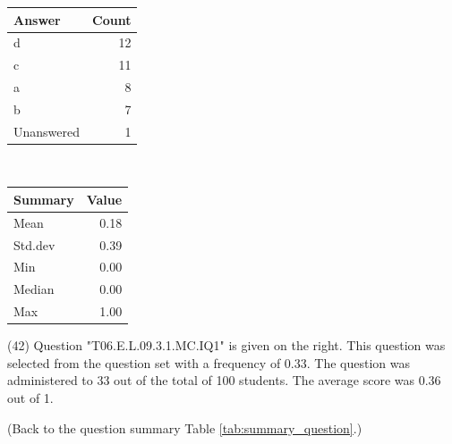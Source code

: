 \documentclass[12pt,nohyper]{tufte-handout}\usepackage[]{graphicx}\usepackage[]{color}
\begin{document}
\begin{center}%
\begin{tabular}{lr}
  \hline
Answer & Count \\ 
  \hline
d &  12 \\ 
  c &  11 \\ 
  a &   8 \\ 
  b &   7 \\ 
  Unanswered &   1 \\ 
   \hline
\end{tabular}
~~~~~~~~%
\begin{tabular}{lr}
  \hline
Summary & Value \\ 
  \hline
Mean & 0.18 \\ 
  Std.dev & 0.39 \\ 
  Min & 0.00 \\ 
  Median & 0.00 \\ 
  Max & 1.00 \\ 
   \hline
\end{tabular}
\end{center}\newpage{} (42) Question "T06.E.L.09.3.1.MC.IQ1" is given on the right. This question was selected from the question set with a frequency of 0.33. The question was administered to 33 out of the total of 100 students. The average score was 0.36 out of 1.

 (Back to the question summary Table \ref{tab:summary_question}.)
\end{document}
